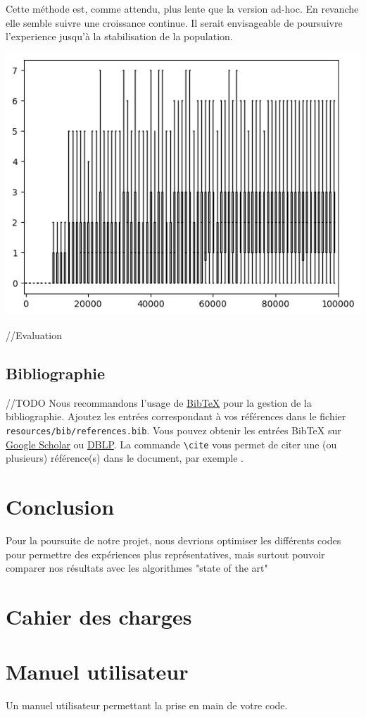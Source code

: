 \documentclass[a4paper, 12pt]{report}
\begin{document}
Cette méthode est, comme attendu, plus lente que la version ad-hoc. En revanche elle semble suivre une croissance continue. Il serait envisageable de poursuivre l'experience jusqu'à la stabilisation de la population.
	
	
\includegraphics{learner_boxplot}
	
	//Evaluation 

    \section{Bibliographie}
//TODO
Nous recommandons l'usage de \href{https://fr.wikipedia.org/wiki/BibTeX}{BibTeX} pour la gestion de la bibliographie. Ajoutez les entrées correspondant à vos références dans le fichier \verb+resources/bib/references.bib+. Vous pouvez obtenir les entrées BibTeX sur \href{https://scholar.google.com}{Google Scholar} ou \href{https://dblp.uni-trier.de}{DBLP}. La commande \verb+\cite+ vous permet de citer une (ou plusieurs) référence(s) dans le document, par exemple \cite{pakin2020comprehensive,RusselNorvig}.

\chapter{Conclusion}
Pour la poursuite de notre projet, nous devrions optimiser les différents codes pour permettre des expériences plus représentatives, mais surtout pouvoir comparer nos résultats avec les algorithmes "state of the art"


    \appendix

    \chapter{Cahier des charges}

     \chapter{Manuel utilisateur}
	Un manuel utilisateur permettant la prise en main de votre code. 
\end{document}
